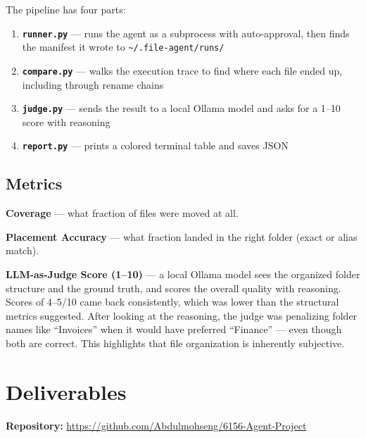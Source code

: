 \documentclass{article}
\begin{document}
The pipeline has four parts:

\begin{enumerate}
    \item \textbf{\texttt{runner.py}} — runs the agent as a subprocess with auto-approval, then finds the manifest it wrote to \texttt{\textasciitilde/.file-agent/runs/}
    \item \textbf{\texttt{compare.py}} — walks the execution trace to find where each file ended up, including through rename chains
    \item \textbf{\texttt{judge.py}} — sends the result to a local Ollama model and asks for a 1–10 score with reasoning
    \item \textbf{\texttt{report.py}} — prints a colored terminal table and saves JSON
\end{enumerate}

\subsection{Metrics}

\textbf{Coverage} — what fraction of files were moved at all.

\textbf{Placement Accuracy} — what fraction landed in the right folder (exact or alias match).

\textbf{LLM-as-Judge Score (1--10)} — a local Ollama model sees the organized folder structure and the ground truth, and scores the overall quality with reasoning. Scores of 4--5/10 came back consistently, which was lower than the structural metrics suggested. After looking at the reasoning, the judge was penalizing folder names like ``Invoices'' when it would have preferred ``Finance'' — even though both are correct. This highlights that file organization is inherently subjective.

\section{Deliverables}

\textbf{Repository:} \url{https://github.com/Abdulmohseng/6156-Agent-Project}
\end{document}
